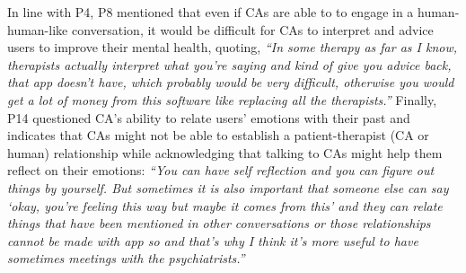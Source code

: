         In line with P4, P8 mentioned that even if \acp{CA} are able to to engage in a human-human-like conversation, it would be difficult for \acp{CA} to interpret and advice users to improve their mental health, quoting,
                \textit{``In some therapy as far as I know, therapists actually interpret what you're saying and kind of give you advice back, that \acl{app} doesn't have, which probably would be very difficult, otherwise you would get a lot of money from this software like replacing all the therapists.''
                }
        Finally, P14 questioned \ac{CA}'s ability to relate users' emotions with their past and 
        indicates that \acp{CA} might not be able to establish a patient-therapist (\ac{CA} or human) relationship while acknowledging that talking to \acp{CA} might help them reflect on their emotions:
                \textit{``You can have self reflection and you can figure out things by yourself. But sometimes it is also important that someone else can say `okay, you're feeling this way but maybe it comes from this' and they can relate things that have been mentioned in other conversations or those relationships cannot be made with \acl{app} so and that's why I think it's more useful to have sometimes meetings with the psychiatrists.''}
            
        
        
        
        

